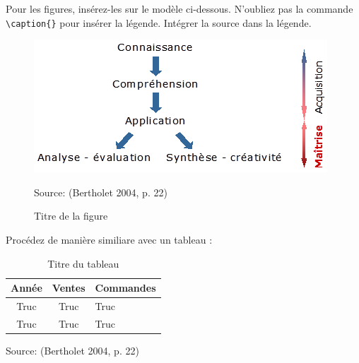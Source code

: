 Pour les figures, insérez-les sur le modèle ci-dessous. N'oubliez pas la commande \verb?\caption{}? pour insérer la légende. Intégrer la source dans la légende.

\begin{figure}[H]
	\noindent \begin{centering}
	\caption{Titre de la figure}
	\bigskip{}
		\includegraphics{images/image3.png}\bigskip{}
	\par\end{centering}
	\noindent \begin{raggedleft}
		Source: (Bertholet 2004, p. 22) %
	\par\end{raggedleft}
\end{figure}

Procédez de manière similiare avec un tableau :

\begin{table}
	\noindent \begin{centering}
	\caption{Titre du tableau}
	\bigskip{}
		\begin{tabular}[h]{|c|c|m{0.2\textwidth}|}
			\hline
			Année & Ventes & Commandes \\
			\hline
			Truc & Truc & Truc \\
			\hline
			Truc & Truc & Truc \\
			\hline
		\end{tabular}
	\par\end{centering}
	\noindent \begin{raggedleft}
		Source: (Bertholet 2004, p. 22) %
	\par\end{raggedleft}
\end{table}

